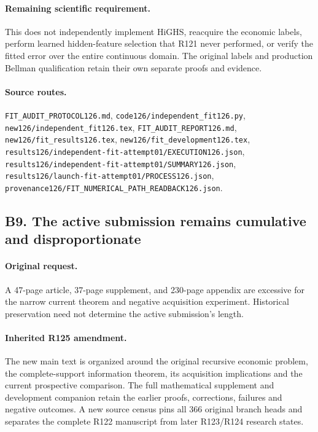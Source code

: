 \paragraph{Remaining scientific requirement.} This does not independently implement HiGHS, reacquire the economic labels, perform learned hidden-feature selection that R121 never performed, or verify the fitted error over the entire continuous domain. The original labels and production Bellman qualification retain their own separate proofs and evidence.

\paragraph{Source routes.} \nolinkurl{FIT_AUDIT_PROTOCOL126.md}, \nolinkurl{code126/independent_fit126.py}, \nolinkurl{new126/independent_fit126.tex}, \nolinkurl{FIT_AUDIT_REPORT126.md}, \nolinkurl{new126/fit_results126.tex}, \nolinkurl{new126/fit_development126.tex}, \nolinkurl{results126/independent-fit-attempt01/EXECUTION126.json}, \nolinkurl{results126/independent-fit-attempt01/SUMMARY126.json}, \nolinkurl{results126/launch-fit-attempt01/PROCESS126.json}, \nolinkurl{provenance126/FIT_NUMERICAL_PATH_READBACK126.json}.

\subsection*{B9. The active submission remains cumulative and disproportionate}
\paragraph{Original request.} A 47-page article, 37-page supplement, and 230-page appendix are excessive for the narrow current theorem and negative acquisition experiment. Historical preservation need not determine the active submission's length.

\paragraph{Inherited R125 amendment.} The new main text is organized around the original recursive economic problem, the complete-support information theorem, its acquisition implications and the current prospective comparison. The full mathematical supplement and development companion retain the earlier proofs, corrections, failures and negative outcomes. A new source census pins all 366 original branch heads and separates the complete R122 manuscript from later R123/R124 research states.


